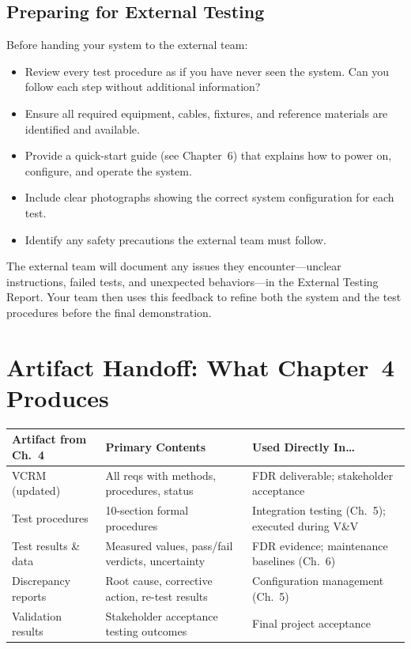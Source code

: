 \documentclass[11pt,letterpaper,twoside,openany]{book}
\begin{document}
\subsection{Preparing for External Testing}
Before handing your system to the external team:
\begin{itemize}[leftmargin=1.5em]
\item Review every test procedure as if you have never seen the system. Can you follow each step without additional information?
\item Ensure all required equipment, cables, fixtures, and reference materials are identified and available.
\item Provide a quick-start guide (see Chapter~6) that explains how to power on, configure, and operate the system.
\item Include clear photographs showing the correct system configuration for each test.
\item Identify any safety precautions the external team must follow.
\end{itemize}

The external team will document any issues they encounter---unclear instructions, failed tests, and unexpected behaviors---in the External Testing Report. Your team then uses this feedback to refine both the system and the test procedures before the final demonstration.

\FloatBarrier
\section{Artifact Handoff: What Chapter~4 Produces}

\begin{center}
\small
\begin{tabularx}{\textwidth}{l X X}
\toprule
\textbf{Artifact from Ch.~4} & \textbf{Primary Contents} & \textbf{Used Directly In\ldots} \\
\midrule
VCRM (updated) & All reqs with methods, procedures, status & FDR deliverable; stakeholder acceptance \\
Test procedures & 10-section formal procedures & Integration testing (Ch.~5); executed during V\&V \\
Test results \& data & Measured values, pass/fail verdicts, uncertainty & FDR evidence; maintenance baselines (Ch.~6) \\
Discrepancy reports & Root cause, corrective action, re-test results & Configuration management (Ch.~5) \\
Validation results & Stakeholder acceptance testing outcomes & Final project acceptance \\
\bottomrule
\end{tabularx}
\end{center}
\end{document}
